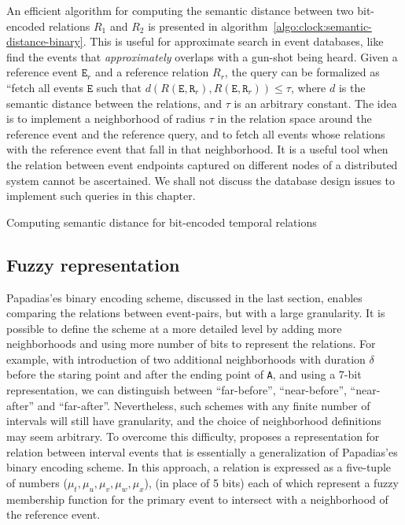 An efficient algorithm for computing the semantic distance between two bit-encoded relations $R_1$ and $R_2$ is presented in 
algorithm~\ref{algo:clock:semantic-distance-binary}. This is useful for approximate search in event databases, like find the events
that {\it approximately} overlaps with a gun-shot being heard. Given a reference event $\texttt{E}_r$ and a reference relation 
$R_r$, the query can be formalized as ``fetch all events $\texttt{E}$ such that 
$d( R(\texttt{E}, \texttt{R}_r), R(\texttt{E}, \texttt{R}_r)) \leq \tau$, where $d$ is the semantic distance between the relations, and 
$\tau$ is an arbitrary constant. The idea is to implement a neighborhood of radius $\tau$ in the relation space around the
reference event and the reference query, and to fetch all events whose relations with the reference event that fall in that neighborhood. 
It is a useful tool when the relation between event endpoints captured on different nodes of a distributed system cannot be ascertained.
We shall not discuss the database design issues to implement such queries in this chapter.

\begin{algorithm}[!htbp]
	\SetAlgoLined
	\DontPrintSemicolon
	\caption{Computing semantic distance for bit-encoded temporal relations}
	\label{algo:clock:semantic-distance-binary}
\end{algorithm}

\subsection{Fuzzy representation}
\label{sec:clock:fuzzy}

Papadias'es binary encoding scheme, discussed in the last section, enables comparing the relations between event-pairs, 
but with a large granularity. It is possible to define the scheme at a more detailed level by adding more neighborhoods 
and using more number of bits to represent the relations. For example, with introduction of two additional neighborhoods 
with duration $\delta$ before the staring point and after the ending point of \texttt{A}, and using a 7-bit representation, 
we can distinguish between ``far-before'', ``near-before'', ``near-after'' and ``far-after''. Nevertheless, such schemes
with any finite number of intervals will still have granularity, and the choice of neighborhood definitions may seem arbitrary.
%
To overcome this difficulty, \cite{Wattamwar:2008} proposes a representation for relation between interval events that is 
essentially a generalization of Papadias'es binary encoding scheme. In this approach, a relation is expressed as a five-tuple
of numbers ($\mu_t, \mu_u, \mu_v, \mu_w, \mu_x$), (in place of 5 bits) each of which represent a fuzzy membership function for 
the primary event to intersect with a neighborhood of the reference event. 

